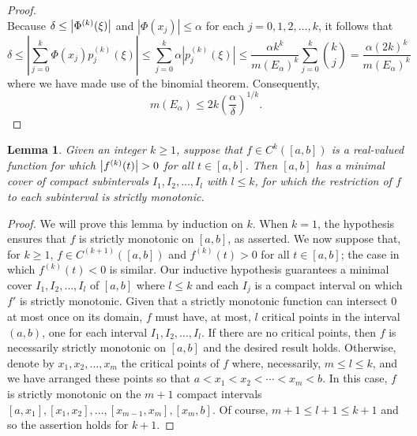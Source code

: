 \documentclass[11pt, letter]{book}
\newtheorem{lemma}[theorem]{Lemma}
\begin{document}
\begin{proof}
\begin{equation*}
\end{equation*}
Because $\delta\leq \abs{\Phi^{(k)}(\xi)}$ and $|\Phi(x_j)|\leq \alpha$ for each $j=0,1,2,\dots,k$, it follows that
\begin{equation*}
\delta\leq \left|\sum_{j=0}^k \Phi(x_j)p_j^{(k)}(\xi)\right|\leq \sum_{j=0}^k\alpha|p_j^{(k)}(\xi)|\leq \frac{\alpha k^k}{m(E_\alpha)^k}\sum_{j=0}^k{k\choose j}=\frac{\alpha (2k)^k}{m(E_\alpha)^k}
\end{equation*}
where we have made use of the binomial theorem. Consequently,
\begin{equation*}
    m(E_\alpha)\leq 2k\left(\frac{\alpha}{\delta}\right)^{1/k}.
\end{equation*}
\end{proof}

\begin{framed}
\begin{lemma}\label{lem:CriticalPoints} Given an integer $k \geq 1$, suppose that $f \in C^k([a,b])$ is a real-valued function for which $\abs{f^{(k)}(t)} > 0$ for all $t\in [a,b]$. Then $[a,b]$ has a minimal cover of compact subintervals $I_1,I_2,\dots,I_l$ with $l\leq k$, for which the restriction of $f$ to each subinterval is strictly monotonic.
\end{lemma}
\end{framed}

\begin{proof}
We will prove this lemma by induction on $k$. When $k=1$, the hypothesis ensures that $f$ is strictly monotonic on $[a,b]$, as asserted. We now suppose that, for $k\geq 1$, $f\in C^{(k+1)}([a,b])$ and $f^{(k)}(t)>0$ for all $t\in [a,b]$; the case in which $f^{(k)}(t)<0$ is similar. Our inductive hypothesis guarantees a minimal cover $I_1,I_2,\dots,I_l$ of $[a,b]$ where $l\leq k$ and each $I_j$ is a compact interval on which $f'$ is strictly monotonic. Given that a strictly monotonic function can intersect $0$ at most once on its domain, $f$ must have, at most, $l$ critical points in the interval $(a,b)$, one for each interval $I_1,I_2,\dots,I_l$. If there are no critical points, then $f$ is necessarily strictly monotonic on $[a,b]$ and the desired result holds. Otherwise, denote by $x_1,x_2,\dots,x_m$ the critical points of $f$ where, necessarily, $m\leq l\leq k$, and we have arranged these points so that $a<x_1<x_2<\cdots<x_m<b$. In this case, $f$ is strictly monotonic on the $m+1$ compact intervals $[a,x_1],[x_1,x_2],\dots,[x_{m-1},x_m],[x_m,b]$. Of course, $m+1\leq l+1\leq k+1$ and so the assertion holds for $k+1$.
\end{proof}
\end{document}
